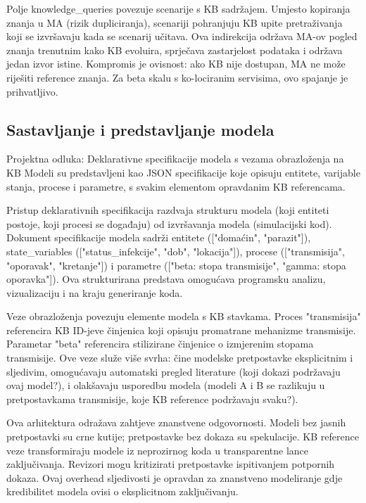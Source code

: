 \documentclass[12pt,a4paper]{article}
\begin{document}
Polje knowledge\_queries povezuje scenarije s KB sadržajem. Umjesto kopiranja znanja u MA (rizik dupliciranja), scenariji pohranjuju KB upite pretraživanja koji se izvršavaju kada se scenarij učitava. Ova indirekcija održava MA-ov pogled znanja trenutnim kako KB evoluira, sprječava zastarjelost podataka i održava jedan izvor istine. Kompromis je ovisnost: ako KB nije dostupan, MA ne može riješiti reference znanja. Za beta skalu s ko-lociranim servisima, ovo spajanje je prihvatljivo.

\subsection{Sastavljanje i predstavljanje modela}

\begin{rationale}{Projektna odluka: Deklarativne specifikacije modela s vezama obrazloženja na KB}
Modeli su predstavljeni kao JSON specifikacije koje opisuju entitete, varijable stanja, procese i parametre, s svakim elementom opravdanim KB referencama.
\end{rationale}

Pristup deklarativnih specifikacija razdvaja strukturu modela (koji entiteti postoje, koji procesi se događaju) od izvršavanja modela (simulacijski kod). Dokument specifikacije modela sadrži entitete (["domaćin", "parazit"]), state\_variables (["status\_infekcije", "dob", "lokacija"]), procese (["transmisija", "oporavak", "kretanje"]) i parametre (["beta: stopa transmisije", "gamma: stopa oporavka"]). Ova strukturirana predstava omogućava programsku analizu, vizualizaciju i na kraju generiranje koda.

Veze obrazloženja povezuju elemente modela s KB stavkama. Proces "transmisija" referencira KB ID-jeve činjenica koji opisuju promatrane mehanizme transmisije. Parametar "beta" referencira stilizirane činjenice o izmjerenim stopama transmisije. Ove veze služe više svrha: čine modelske pretpostavke eksplicitnim i sljedivim, omogućavaju automatski pregled literature (koji dokazi podržavaju ovaj model?), i olakšavaju usporedbu modela (modeli A i B se razlikuju u pretpostavkama transmisije, koje KB reference podržavaju svaku?).

Ova arhitektura odražava zahtjeve znanstvene odgovornosti. Modeli bez jasnih pretpostavki su crne kutije; pretpostavke bez dokaza su spekulacije. KB reference veze transformiraju modele iz neprozirnog koda u transparentne lance zaključivanja. Revizori mogu kritizirati pretpostavke ispitivanjem potpornih dokaza. Ovaj overhead sljedivosti je opravdan za znanstveno modeliranje gdje kredibilitet modela ovisi o eksplicitnom zaključivanju.
\end{document}
